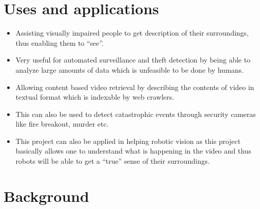 \documentclass[12pt]{article}
\begin{document}
	\section{Uses and applications}
			\begin{itemize}
				\item
					Assisting visually impaired people to get description of their surroundings, thus enabling them to ``see''.
				\item
					Very useful for automated surveillance and theft detection by being able to analyze large amounts of data which is unfeasible to be done by humans.
				\item
					Allowing content based video retrieval by describing the contents of video in textual format which is indexable by web crawlers.
				\item
					This can also be used to detect catastrophic events through security cameras like fire breakout, murder etc.
				\item
					This project can also be applied in helping robotic vision as this project basically allows one to understand what is happening in the video and thus robots will be able to get a ``true'' sense of their surroundings.
			\end{itemize}



	\section{Background} 
\end{document}

